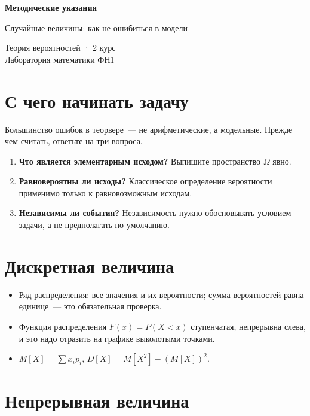 \documentclass[12pt, a4paper]{article}
\begin{document}
\begin{center}
  {\large\bfseries Методические указания}

  \vspace{0.3em}
  {\large Случайные величины: как не ошибиться в модели}

  \vspace{0.5em}
  {\small Теория вероятностей · 2 курс\\ Лаборатория математики ФН1}
\end{center}
\vspace{1em}

\section*{С чего начинать задачу}

Большинство ошибок в теорвере~--- не арифметические, а модельные.
Прежде чем считать, ответьте на три вопроса.

\begin{enumerate}[nosep]
  \item \textbf{Что является элементарным исходом?} Выпишите пространство $\Omega$ явно.
  \item \textbf{Равновероятны ли исходы?} Классическое определение вероятности
        применимо только к равновозможным исходам.
  \item \textbf{Независимы ли события?} Независимость нужно обосновывать условием задачи,
        а не предполагать по умолчанию.
\end{enumerate}

\section*{Дискретная величина}

\begin{itemize}[nosep]
  \item Ряд распределения: все значения и их вероятности; сумма вероятностей равна единице~---
        это обязательная проверка.
  \item Функция распределения $F(x) = P(X < x)$ ступенчатая, непрерывна слева,
        и это надо отразить на графике выколотыми точками.
  \item $M[X] = \sum x_i p_i$, \quad $D[X] = M[X^2] - (M[X])^2$.
\end{itemize}

\section*{Непрерывная величина}
\end{document}
